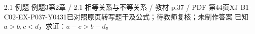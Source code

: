 \par\noindent\begin{minipage}{\linewidth}
\begin{bankitem}{2.1 例题 例题3}{第2章 / 2.1 相等关系与不等关系 / 教材 p.37 / PDF 第44页}{XJ-B1-C02-EX-P037-Y0431}{已对照原页转写题干及公式；待教师复核；未制作答案}
已知 $a>b,c<d$，求证：$a-c>b-d$。
\end{bankitem}
\end{minipage}\par\medskip
